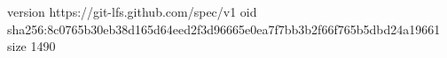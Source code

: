 version https://git-lfs.github.com/spec/v1
oid sha256:8c0765b30eb38d165d64eed2f3d96665e0ea7f7bb3b2f66f765b5dbd24a19661
size 1490
